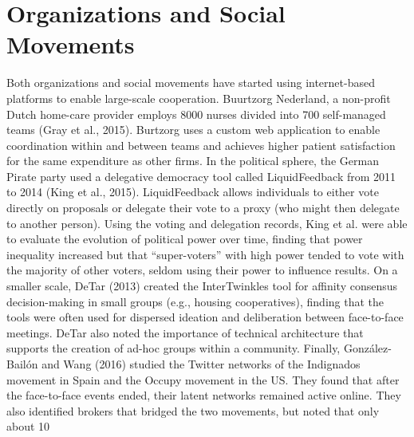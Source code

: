 \section{Organizations and Social Movements}
Both organizations and social movements have started using internet-based platforms to enable large-scale cooperation. Buurtzorg Nederland, a non-profit Dutch home-care provider employs 8000 nurses divided into 700 self-managed teams (Gray et al., 2015). Burtzorg uses a custom web application to enable coordination within and between teams and achieves higher patient satisfaction for the same expenditure as other firms. In the political sphere, the German Pirate party used a delegative democracy tool called LiquidFeedback from 2011 to 2014 (King et al., 2015). LiquidFeedback allows individuals to either vote directly on proposals or delegate their vote to a proxy (who might then delegate to another person). Using the voting and delegation records, King et al. were able to evaluate the evolution of political power over time, finding that power inequality increased but that “super-voters” with high power tended to vote with the majority of other voters, seldom using their power to influence results. On a smaller scale, DeTar (2013) created the InterTwinkles tool for affinity consensus decision-making in small groups (e.g., housing cooperatives), finding that the tools were often used for dispersed ideation and deliberation between face-to-face meetings. DeTar also noted the importance of technical architecture that supports the creation of ad-hoc groups within a community. Finally, Gonz\'alez-Bail\'on and Wang (2016) studied the Twitter networks of the Indignados movement in Spain and the Occupy movement in the US. They found that after the face-to-face events ended, their latent networks remained active online. They also identified brokers that bridged the two movements, but noted that only about 10%

